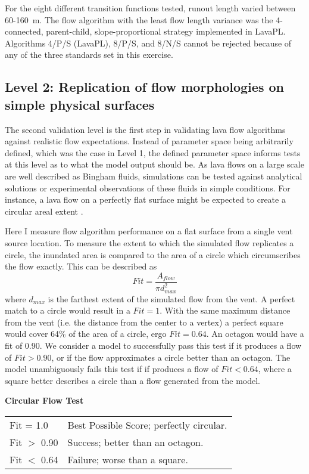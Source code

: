 			For the eight different transition functions tested, runout length varied between 60-160~m. The flow algorithm with the least flow length variance was the 4-connected, parent-child, slope-proportional strategy implemented in LavaPL. Algorithms 4/P/S (LavaPL), 8/P/S, and 8/N/S cannot be rejected because of any of the three standards set in this exercise.

	\subsection{Level 2: Replication of flow morphologies on simple physical surfaces}
	
	The second validation level is the first step in validating lava flow algorithms against realistic flow expectations. Instead of parameter space being arbitrarily defined, which was the case in Level 1, the defined parameter space informs tests at this level as to what the model output should be. As lava flows on a large scale are well described as Bingham fluids, simulations can be tested against analytical solutions or experimental observations of these fluids in simple conditions. For instance, a lava flow on a perfectly flat surface might be expected to create a circular areal extent \citep{griffiths2000dynamics}.
	
			Here I measure flow algorithm performance on a flat surface from a single vent source location. To measure the extent to which the simulated flow replicates a circle, the inundated area is compared to the area of a circle which circumscribes the flow exactly. This can be described as
			\begin{equation}
				Fit = \frac{A_{flow}}{\pi d_{max}^2}
			\end{equation}
			where $d_{max}$ is the farthest extent of the simulated flow from the vent. A perfect match to a circle would result in a $Fit=1$. With the same maximum distance from the vent (i.e. the distance from the center to a vertex) a perfect square would cover 64\% of the area of a circle, ergo $Fit=0.64$. An octagon would have a fit of 0.90. We consider a model to successfully pass this test if it produces a flow of $Fit>0.90$, or if the flow approximates a circle better than an octagon. The model unambiguously fails this test if if produces a flow of $Fit<0.64$, where a square better describes a circle than a flow generated from the model.

			\begin{center}
				\textbf{Circular Flow Test}
				
				\begin{tabular}{l l}
					\toprule
					Fit = 1.0 & Best Possible Score; perfectly circular.\\
					Fit $>$ 0.90 & Success; better than an octagon. \\
					Fit $<$ 0.64 & Failure; worse than a square.\\
					\bottomrule
				\end{tabular}
			\end{center}
		
